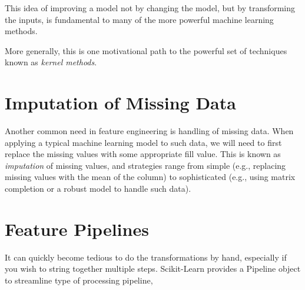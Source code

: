 \begin{tcolorbox}
    This idea of improving a model not by changing the model, but by transforming the inputs, is fundamental to many of the more powerful machine learning methods.

    More generally, this is one motivational path to the powerful set of techniques known
    as \textit{kernel methods}.
\end{tcolorbox}

\section{Imputation of Missing Data}
Another common need in feature engineering is handling of missing data. When applying a typical machine learning model to such data, we will need to first
replace the missing values with some appropriate fill value. This is known as \textit{imputation} of missing values, and strategies range from simple (e.g., replacing missing values
with the mean of the column) to sophisticated (e.g., using matrix completion or a robust model to handle such data).

\section{Feature Pipelines}
It can quickly become tedious to do the transformations by hand, especially if you wish to string together multiple steps. Scikit-Learn provides a Pipeline object to streamline type of processing pipeline,